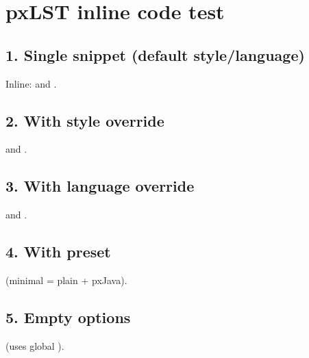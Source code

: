 \documentclass{article}
\begin{document}
\section*{pxLST inline code test}

\subsection*{1. Single snippet (default style/language)}
Inline:  and .

\subsection*{2. With style override}
 and .

\subsection*{3. With language override}
 and .

\subsection*{4. With preset}
 (minimal = plain + pxJava).

\subsection*{5. Empty options}
 (uses global \pxLSTsetup).
\end{document}
